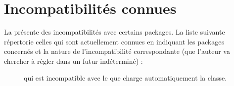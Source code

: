 \chapter{Incompatibilités connues}
\label{cha-incomp-conn}
%

La \yatCl{} présente des incompatibilités avec certains packages.  La liste
suivante répertorie %
celles qui sont actuellement connues %
en indiquant
les packages concernés %
et la nature de l'incompatibilité correspondante (que l'auteur va chercher
à régler dans un futur indéterminé) :
\begin{description}
\item[] qui est incompatible avec le  que
  charge automatiquement la classe.
\end{description}
